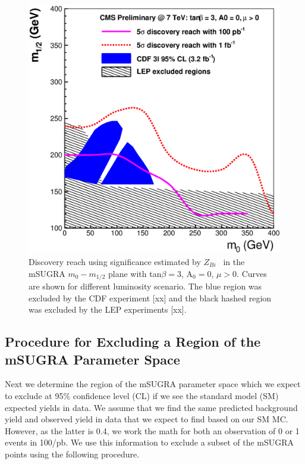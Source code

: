 \vspace{3 mm}
\begin{figure}[htb]
\begin{center}
\includegraphics[width=0.7\linewidth]{figs/massreachss_bi.eps}
\caption{Discovery reach using significance estimated by $Z_{Bi}$~\cite{cite:cousins} 
in the mSUGRA $m_{0}-m_{1/2}$ plane with tan$\beta = 3$, A$_0 = 0$, $\mu > 0$. 
Curves are shown for different luminosity scenario. The blue region was excluded by 
the CDF experiment [xx] and the black hashed region was excluded by the LEP 
experiments [xx].\label{fig:ss_zbi}}
\end{center}
\end{figure}

\subsection{Procedure for Excluding a Region of the mSUGRA Parameter Space}
\label{sec:exclusion}

Next we  determine the region of  the mSUGRA parameter  space which we
expect  to exclude  at 95\%  confidence level  (CL) if  we see
the standard model (SM) expected yields in data. 
We  assume  that  we find  the  same
predicted background yield  and observed yield in data  that we expect
to  find based on  our SM  MC. However, as the latter is 0.4,
we work the math for both an observation of 0 or 1 events in 100/pb.
We  use this  information to  exclude a subset of the mSUGRA points using 
the following procedure.

